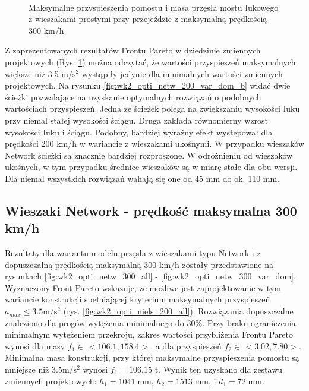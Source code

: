\begin{figure}[hbt!]
	\centering
	\\
	\captionsetup{justification=centering}
	\caption{Maksymalne przyspieszenia pomostu i masa przęsła mostu łukowego z wieszakami prostymi przy przejeździe z maksymalną prędkością 300 km/h}
	\label{fig:wk2_opti_netw_200_var_dom}
\end{figure}

Z zaprezentowanych rezultatów Frontu Pareto w dziedzinie zmiennych projektowych (Rys. \ref{fig:wk2_opti_netw_200_var_dom}) można odczytać, że wartości przyspieszeń maksymalnych większe niż 3.5 $\mathrm{m/s^2}$ wystąpiły jedynie dla minimalnych wartości zmiennych projektowych. Na rysunku \ref{fig:wk2_opti_netw_200_var_dom_b} widać dwie ścieżki pozwalające na uzyskanie optymalnych rozwiązań o podobnych wartościach przyspieszeń. Jedna ze ścieżek polega na zwiększaniu wysokości łuku przy niemal stałej wysokości ściągu. Druga zakłada równomierny wzrost wysokości łuku i ściągu. Podobny, bardziej wyraźny efekt występował dla prędkości 200 km/h w wariancie z wieszakami ukośnymi. W przypadku wieszaków Network ścieżki są znacznie bardziej rozproszone. W odróżnieniu od wieszaków ukośnych, w tym przypadku średnice wieszaków są w miarę stałe dla obu wersji. Dla niemal wszystkich rozwiązań wahają się one od 45 mm do ok. 110 mm.





\pagebreak[4]
\subsection{Wieszaki Network - prędkość maksymalna 300 km/h}

Rezultaty dla wariantu modelu przęsła z wieszakami typu Network i z dopuszczalną prędkością maksymalną 300 km/h zostały przedstawione na rysunkach \ref{fig:wk2_opti_netw_300_all} - \ref{fig:wk2_opti_netw_300_var_dom}. Wyznaczony Front Pareto wskazuje, że możliwe jest zaprojektowanie w tym wariancie konstrukcji spełniającej kryterium maksymalnych przyspieszeń $a_{max}\le 3.5 \mathrm{m/s^2}$ (rys. \ref{fig:wk2_opti_niels_200_all}). Rozwiązania dopuszczalne znaleziono dla progów wytężenia minimalnego do 30\%. Przy braku ograniczenia minimalnym wytężeniem przekroju, zakres wartości przybliżenia Frontu Pareto wynosi dla masy $f_1 \in\,<106.1,158.4>$, a dla przyspieszeń $f_2 \in\,<3.02,7.80>$. Minimalna masa konstrukcji, przy której maksymalne przyspieszenia pomostu są mniejsze niż $3.5 \mathrm{m/s^2}$ wynosi $f_1 = 106.15$ t. Wynik ten uzyskano dla zestawu zmiennych projektowych: $h_1 = 1041\;\mathrm{mm}$, $h_2 = 1513\;\mathrm{mm}$, i $d_1 = 72\;\mathrm{mm}$.


